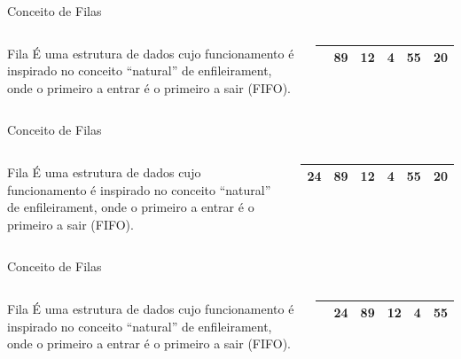 \documentclass[12pt,table,xcolor={dvipsnames}]{beamer}
\begin{document}
\begin{frame}{Conceito de Filas}
\begin{columns}
\begin{block}{Fila}
É uma estrutura de dados cujo funcionamento é inspirado no conceito “natural” de enfileirament, onde o primeiro a entrar é o primeiro a sair (FIFO).
\end{block}
\begin{center}
{
\begin{tabular}{ |p{.5cm}|p{.5cm}|p{.5cm}|p{.5cm}|p{.5cm}|p{.5cm}| }
\hline
 & 89 & 12 & 4 & 55 & 20 \\ \hline
\end{tabular}
}
\end{center}
\end{columns}
\end{frame}

\begin{frame}{Conceito de Filas}
\begin{columns}
\begin{block}{Fila}
É uma estrutura de dados cujo funcionamento é inspirado no conceito “natural” de enfileirament, onde o primeiro a entrar é o primeiro a sair (FIFO).
\end{block}
\begin{center}
{
\begin{tabular}{ |p{.5cm}|p{.5cm}|p{.5cm}|p{.5cm}|p{.5cm}|p{.5cm}| }
\hline
24 & 89 & 12 & 4 & 55 & 20 \\ \hline
\end{tabular}
}
\end{center}
\end{columns}
\end{frame}

\begin{frame}{Conceito de Filas}
\begin{columns}
\begin{block}{Fila}
É uma estrutura de dados cujo funcionamento é inspirado no conceito “natural” de enfileirament, onde o primeiro a entrar é o primeiro a sair (FIFO).
\end{block}
\begin{center}
{
\begin{tabular}{ |p{.5cm}|p{.5cm}|p{.5cm}|p{.5cm}|p{.5cm}|p{.5cm}| }
\hline
& 24 & 89 & 12 & 4 & 55 \\ \hline
\end{tabular}
}
\end{center}
\end{columns}
\end{frame}
\end{document}
